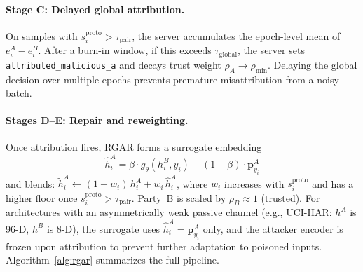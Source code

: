 \documentclass{article}
\begin{document}
\paragraph{Stage C: Delayed global attribution.}
On samples with $s^{\mathrm{proto}}_i\!>\!\tau_{\mathrm{pair}}$, the server
accumulates the epoch-level mean of $e^A_i\!-\!e^B_i$.
After a burn-in window, if this exceeds $\tau_{\mathrm{global}}$, the server
sets \texttt{attributed\_malicious\_a} and decays trust weight
$\rho_A\to\rho_{\min}$.
Delaying the global decision over multiple epochs prevents premature
misattribution from a noisy batch.

\paragraph{Stages D--E: Repair and reweighting.}
Once attribution fires, RGAR forms a surrogate embedding
\begin{equation}
  \hat{h}^A_i = \beta\!\cdot\!g_\theta(h^B_i,y_i)
               + (1-\beta)\!\cdot\!\mathbf{p}^A_{y_i}
  \label{eq:surrogate}
\end{equation}
and blends:
$\tilde{h}^A_i \leftarrow (1-w_i)\,h^A_i + w_i\,\hat{h}^A_i$,
where $w_i$ increases with $s^{\mathrm{proto}}_i$ and has a higher floor
once $s^{\mathrm{proto}}_i\!>\!\tau_{\mathrm{pair}}$.
Party~B is scaled by $\rho_B\!\approx\!1$ (trusted).
For architectures with an asymmetrically weak passive channel
(e.g., UCI-HAR: $h^A$ is 96-D, $h^B$ is 8-D), the surrogate uses
$\hat{h}^A_i\!=\!\mathbf{p}^A_{y_i}$ only, and the attacker encoder is
frozen upon attribution to prevent further adaptation to poisoned inputs.
Algorithm~\ref{alg:rgar} summarizes the full pipeline.
\end{document}
